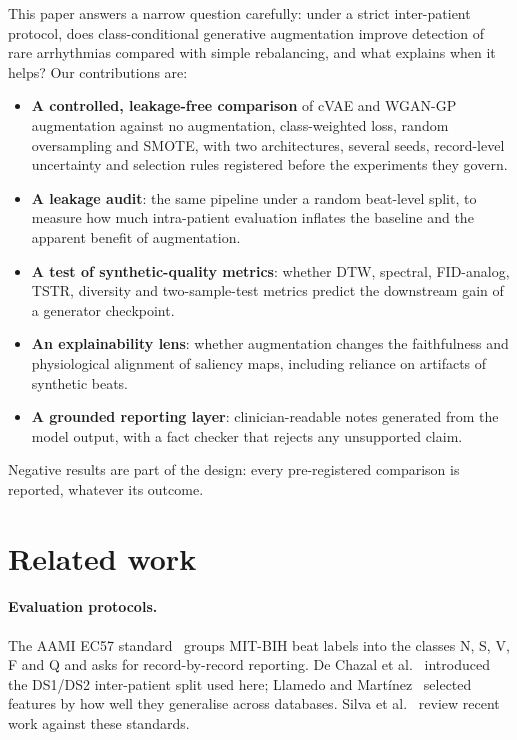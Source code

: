 \documentclass[11pt]{article}
\begin{document}
This paper answers a narrow question carefully: under a strict inter-patient protocol, does
class-conditional generative augmentation improve detection of rare arrhythmias compared with simple
rebalancing, and what explains when it helps? Our contributions are:
\begin{itemize}
\item \textbf{A controlled, leakage-free comparison} of cVAE and WGAN-GP augmentation against no augmentation,
class-weighted loss, random oversampling and SMOTE, with two architectures, several seeds, record-level
uncertainty and selection rules registered before the experiments they govern.
\item \textbf{A leakage audit}: the same pipeline under a random beat-level split, to measure how much
intra-patient evaluation inflates the baseline and the apparent benefit of augmentation.
\item \textbf{A test of synthetic-quality metrics}: whether DTW, spectral, FID-analog, TSTR, diversity and
two-sample-test metrics predict the downstream gain of a generator checkpoint.
\item \textbf{An explainability lens}: whether augmentation changes the faithfulness and physiological alignment
of saliency maps, including reliance on artifacts of synthetic beats.
\item \textbf{A grounded reporting layer}: clinician-readable notes generated from the model output, with a fact
checker that rejects any unsupported claim.
\end{itemize}
Negative results are part of the design: every pre-registered comparison is reported, whatever its outcome.

\section{Related work}
\paragraph{Evaluation protocols.} The AAMI EC57 standard~\cite{aami2012ec57} groups MIT-BIH beat labels into
the classes N, S, V, F and Q and asks for record-by-record reporting. De Chazal et al.~\cite{dechazal2004}
introduced the DS1/DS2 inter-patient split used here; Llamedo and Mart\'inez~\cite{llamedo2011} selected
features by how well they generalise across databases. Silva et
al.~\cite{silva2025review} review recent work against these standards.
\end{document}
